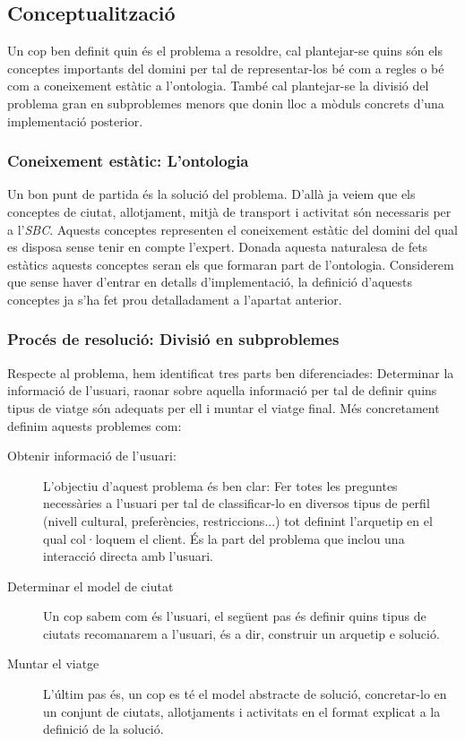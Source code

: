 \documentclass[11pt,a4paper]{article}
\begin{document}
\subsection{Conceptualització}
Un cop ben definit quin és el problema a resoldre, cal plantejar-se quins són els conceptes importants del domini per tal de representar-los bé com a regles o bé com a coneixement estàtic a l'ontologia. També cal plantejar-se la divisió del problema gran en subproblemes menors que donin lloc a mòduls concrets d'una implementació posterior.

\subsubsection{Coneixement estàtic: L'ontologia}

Un bon punt de partida és la solució del problema. D'allà ja veiem que els conceptes de ciutat, allotjament, mitjà de transport i activitat són necessaris per a l'\emph{SBC}. Aquests conceptes representen el coneixement estàtic del domini del qual es disposa sense tenir en compte l'expert. Donada aquesta naturalesa de fets estàtics aquests conceptes seran els que formaran part de l'ontologia. Considerem que sense haver d'entrar en detalls d'implementació, la definició d'aquests conceptes ja s'ha fet prou detalladament a l'apartat anterior.

\subsubsection{Procés de resolució: Divisió en subproblemes}
\label{sec:subprob_informal}

Respecte al problema, hem identificat tres parts ben diferenciades: Determinar la informació de l'usuari, raonar sobre aquella informació per tal de definir quins tipus de viatge són adequats per ell i muntar el viatge final. Més concretament definim aquests problemes com:

\begin{description}
\item[Obtenir informació de l'usuari:] L'objectiu d'aquest problema és ben clar: Fer totes les preguntes necessàries a l'usuari per tal de classificar-lo en diversos tipus de perfil (nivell cultural, preferències, restriccions...) tot definint l'arquetip en el qual col·loquem el client. És la part del problema que inclou una interacció directa amb l'usuari.

\item[Determinar el model de ciutat] Un cop sabem com és l'usuari, el següent pas és definir quins tipus de ciutats recomanarem a l'usuari, és a dir, construir un arquetip e solució.

\item[Muntar el viatge] L'últim pas és, un cop es té el model abstracte de solució, concretar-lo en un conjunt de ciutats, allotjaments i activitats en el format explicat a la definició de la solució.
\end{description}
\end{document}
